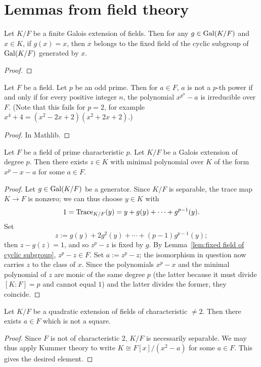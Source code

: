 \section{Lemmas from field theory}

\begin{lemma} \label{lem:fixed field of cyclic subgroup}
\leanok
Let $K/F$ be a finite Galois extension of fields. Then for any $g \in \operatorname{Gal}(K/F)$
and $x \in K$, if $g(x) = x$, then $x$ belongs to the fixed field of the cyclic subgroup of $\operatorname{Gal}(K/F)$ generated by $x$.
\end{lemma}
\begin{proof}
\leanok
\end{proof}

\begin{lemma} \label{lem:p-power extensions}
\mathlibok
Let $F$ be a field.
Let $p$ be an odd prime.
Then for $a \in F$, $a$ is not a $p$-th power
if and only if for every positive integer $n$, the polynomial $x^{p^n}-a$ is irreducible over $F$.
(Note that this fails for $p=2$, for example $x^4+4 = (x^2-2x+2)(x^2+2x+2)$.)
\end{lemma}
\begin{proof}
\mathlibok
In Mathlib.
\end{proof}

\begin{proposition} \label{prop:artin schreier extensions}
\leanok
Let $F$ be a field of prime characteristic $p$.
Let $K/F$ be a Galois extension of degree $p$.
Then there exists $z \in K$ with minimal polynomial over $K$ of the form $x^p-x-a$ for some $a \in F$.
\end{proposition}
\begin{proof}
\leanok
Let $g \in \operatorname{Gal}(K/F)$ be a generator.
Since $K/F$ is separable, the trace map $K \to F$ is nonzero;
we can thus choose $y \in K$ with 
\[
1 = \operatorname{Trace}_{K/F}(y) = y + g(y) + \cdots + g^{p-1}(y).
\]
Set
\[
z := g(y) + 2g^2(y) + \cdots + (p-1) g^{p-1}(y);
\]
then $z - g(z) = 1$, and so $z^p-z$ is fixed by $g$. By Lemma~\ref{lem:fixed field of cyclic subgroup}, $z^p-z \in F$. Set $a := z^p - z$;
the isomorphism in question now carries $z$ to the class of $x$.
Since the polynomials $x^p-x$ and the minimal polynomial of $z$ are monic of the same degree $p$
(the latter because it must divide $[K:F] = p$ and cannot equal $1$) and the latter divides the former, they coincide.
\end{proof}

\begin{lemma} \label{lem:nonsquare in quadratic extension}
\leanok
Let $K/F$ be a quadratic extension of fields of characteristic $\neq 2$.
Then there exists $a \in F$ which is not a square.
\end{lemma}
\begin{proof}
\leanok
Since $F$ is not of characteristic 2, $K/F$ is necessarily separable.
We may thus apply Kummer theory to write $K \cong F[x]/(x^2-a)$ for some $a \in F$.
This gives the desired element.
\end{proof}

